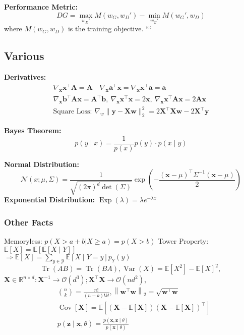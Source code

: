\documentclass[a4paper,11pt]{article}
\begin{document}
\textbf{Performance Metric:}
$$
DG = \max_{w_D'} M(w_G, w_D') - \min_{w_G'} M(w_G', w_D)
$$
where $M(w_G, w_D)$ is the training objective.
```

\subsection*{Various}

\textbf{Derivatives:}
$$
\begin{gathered}
\nabla_{\mathbf{x}} \mathbf{x}^{\top} \mathbf{A}=\mathbf{A} \quad \nabla_{\mathbf{x}} \mathbf{a}^{\top} \mathbf{x}=\nabla_{\mathbf{x}} \mathbf{x}^{\top} \mathbf{a}=\mathbf{a} \\
\nabla_{\mathbf{x}} \mathbf{b}^{\top} \mathbf{A} \mathbf{x}=\mathbf{A}^{\top} \mathbf{b}, \ \nabla_{\mathbf{x}} \mathbf{x}^{\top} \mathbf{x}=2 \mathbf{x}, \ \nabla_{\mathbf{x}} \mathbf{x}^{\top} \mathbf{A} \mathbf{x}=2 \mathbf{A} \mathbf{x} \\
\text{Square Loss: }\nabla_w\|\mathbf{y}-\mathbf{X} \mathbf{w}\|_2^2=2 \mathbf{X}^{\top} \mathbf{X} \mathbf{w}-2 \mathbf{X}^{\top} \mathbf{y}
\end{gathered}
$$

\textbf{Bayes Theorem:}
$$p(y \mid x)=\frac{1}{p(x)} p(y) \cdot p(x \mid y)$$

\textbf{Normal Distribution:}
$$\textstyle\mathcal{N}(x ; \mu, \Sigma)=\frac{1}{\sqrt{(2 \pi)^d \operatorname{det}(\Sigma)}} \exp \left(-\frac{(\mathbf{x}-\mu)^{\top} \Sigma^{-1}(\mathbf{x}-\mu)}{2}\right)$$
\textbf{Exponential Distribution:} $\operatorname{Exp}(\lambda)=\lambda e^{-\lambda x}$
\subsubsection*{Other Facts}
Memoryless: $p(X>a+b | X \geq a)=p(X>b)$
Tower Property: $\mathbb{E}[X]=\mathbb{E}[\mathbb{E}[X \mid Y]]$\\
$\Rightarrow\mathbb{E}[X]=\sum_{y \in \mathcal{Y}} \mathbb{E}[X \mid Y=y] p_Y(y)$
$$
\operatorname{Tr}(A B)=\operatorname{Tr}(B A), \operatorname{Var}(X)=\mathbb{E}\left[X^2\right]-\mathbb{E}[X]^2 \text {, }
$$
$\mathbf{X} \in \mathbb{R}^{n \times d}: \mathbf{X}^{-1} \rightarrow \mathcal{O}\left(d^3\right) ;\mathbf{X}^{\top} \mathbf{X} \rightarrow \mathcal{O}\left(n d^2\right)$,
$$
\begin{aligned}
& \binom{n}{k}=\frac{n!}{(n-k)!k!},\left\|\mathbf{w}^{\top} \mathbf{w}\right\|_2=\sqrt{\mathbf{w}^{\top} \mathbf{w}} \\
& \operatorname{Cov}[\mathbf{X}]=\mathbb{E}\left[(\mathbf{X}-\mathbb{E}[\mathbf{X}])(\mathbf{X}-\mathbb{E}[\mathbf{X}])^{\top}\right] \\
& p(\mathbf{z} \mid \mathbf{x}, \theta)=\frac{p(\mathbf{x}, \mathbf{z} \mid \theta)}{p(\mathbf{x} \mid \theta)}
\end{aligned}
$$
\end{document}
